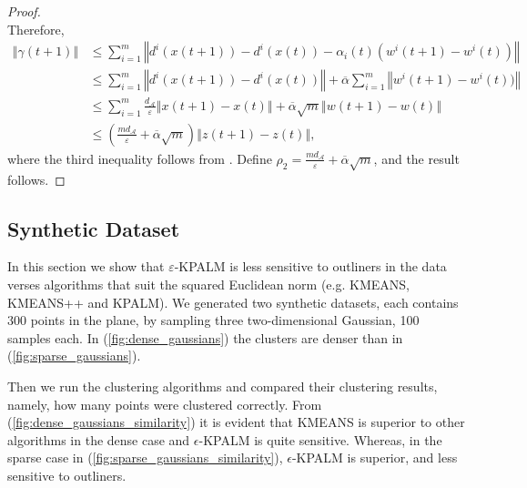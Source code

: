 \documentclass[11pt]{article}
\numberwithin{equation}{section}
\newcommand{\norm}[1]{\left\Vert {#1} \right\Vert} %
\begin{document}
\begin{proof}
\begin{equation*}
\end{equation*}
Therefore,
\begin{align*}
	\norm{\gamma(t+1)} &\leq \sum\limits_{i=1}^m \norm{d^i(x(t+1)) - d^i(x(t)) - \alpha_i(t)(w^i(t+1) - w^i(t))} \\
	&\leq \sum\limits_{i=1}^m \norm{d^i(x(t+1)) - d^i(x(t))} + \overline{\alpha} \sum\limits_{i=1}^m \norm{w^i(t+1) - w^i(t))} \\
	&\leq \sum\limits_{i=1}^m \frac{ d_{\mathcal{A}}}{\varepsilon}\norm{x(t+1) - x(t)} + \overline{\alpha}\sqrt{m}\norm{w(t+1)-w(t)} \\
	&\leq \left(\frac{m d_{\mathcal{A}}}{\varepsilon} + \overline{\alpha}\sqrt{m}\right) \norm{z(t+1)-z(t)},
\end{align*}
where the third inequality follows from . Define $\rho_2 = \frac{m d_{\mathcal{A}}}{\varepsilon} + \overline{\alpha}\sqrt{m}$, and the result follows.
\end{proof}

\subsection{Synthetic Dataset}

In this section we show that $\varepsilon$-KPALM is less sensitive to outliners in the data verses algorithms that suit the squared Euclidean norm (e.g. KMEANS, KMEANS++ and KPALM). We generated two synthetic datasets, each contains 300 points in the plane, by sampling three two-dimensional Gaussian, 100 samples each. In (\ref{fig:dense_gaussians}) the clusters are denser than in (\ref{fig:sparse_gaussians}). 

Then we run the clustering algorithms and compared their clustering results, namely, how many points were clustered correctly. From (\ref{fig:dense_gaussians_similarity}) it is evident that KMEANS is superior to other algorithms in the dense case and $\epsilon$-KPALM is quite sensitive. Whereas, in the sparse case in (\ref{fig:sparse_gaussians_similarity}), $\epsilon$-KPALM is superior, and less sensitive to outliners.
\end{document}

